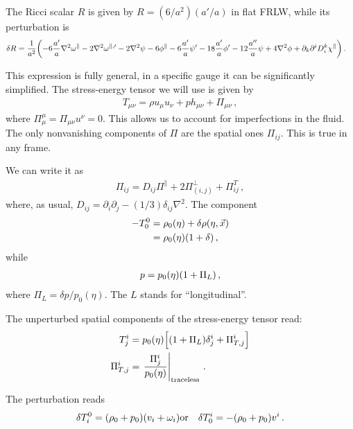 \documentclass[main.tex]{subfiles}
\begin{document}

The Ricci scalar \(R\) is given by \(R = (6/a^2) (a' / a)\) in flat FRLW, while its perturbation is 
%
\begin{align}
\delta R &= \frac{1}{a^2} \qty(- 6 \frac{a'}{a} \nabla^2\omega^{\parallel} - 2 \nabla^2 \omega^{\parallel, \prime} - 2 \nabla^2 \psi - 6 \phi^{\parallel} - 6 \frac{a'}{a} \psi' - 18 \frac{a'}{a} \phi ' - 12 \frac{a''}{a} \psi + 4 \nabla^2 \phi + \partial_{k} \partial^{i} D^{k}_{i} \chi^{\parallel})
\,.
\end{align}

This expression is fully general, in a specific gauge it can be significantly simplified.  
The stress-energy tensor we will use is given by 
%
\begin{align}
T_{\mu \nu } = \rho u_\mu u_\nu + p h_{\mu \nu } + \Pi_{\mu \nu }
\,,
\end{align}
%
where \(\Pi^{\mu }_{\mu } = \Pi_{\mu \nu } u^{\nu } = 0\). This allows us to account for imperfections in the fluid. The only nonvanishing components of \(\Pi \) are the spatial ones \(\Pi_{ij}\). 
This is true in any frame. 

We can write it as 
%
\begin{align}
\Pi_{ij} = D_{ij} \Pi^{\parallel} + 2\Pi^{\perp}_{(i, j)} + \Pi^{T}_{ij}
\,,
\end{align}
%
where, as usual, \(D_{ij} = \partial_{i} \partial_{j} - (1/3) \delta_{ij} \nabla^2\). 
The component 
%
\begin{align}
- T^{0}_{0} &= \rho_{0} (\eta ) + \delta \rho (\eta , \vec{x})  \\
&= \rho_0 (\eta ) \qty(1 + \delta ) 
\,,
\end{align}
%
while 
%
\begin{align}
p = p_0 (\eta ) \qty(1 + \Pi _L) 
\,,
\end{align}
%
where \(\Pi _L = \delta p / p_0 (\eta )\). The \(L\) stands for ``longitudinal''. 

The unperturbed spatial components of the stress-energy tensor read:
%
\begin{align}
T^{i}_{j} &= p_0 (\eta ) \qty[ \qty(1 + \Pi _L) \delta^{i}_{j} + \Pi_{T, j}^{i}]  \\
\Pi_{T, j}^{i} &= \eval{\frac{\Pi^{i}_{j}}{p_0 (\eta )}}_{\text{traceless}}
\,.
\end{align}

The perturbation reads 
%
\begin{align}
\delta T^{0}_{i} = \qty(\rho_0 + p_0 ) \qty(v_i + \omega _i )
&
\text{or}
&
\delta T^{i}_{0} = - (\rho_0 + p_0 ) v^{i}
\,.
\end{align}
\end{document}
